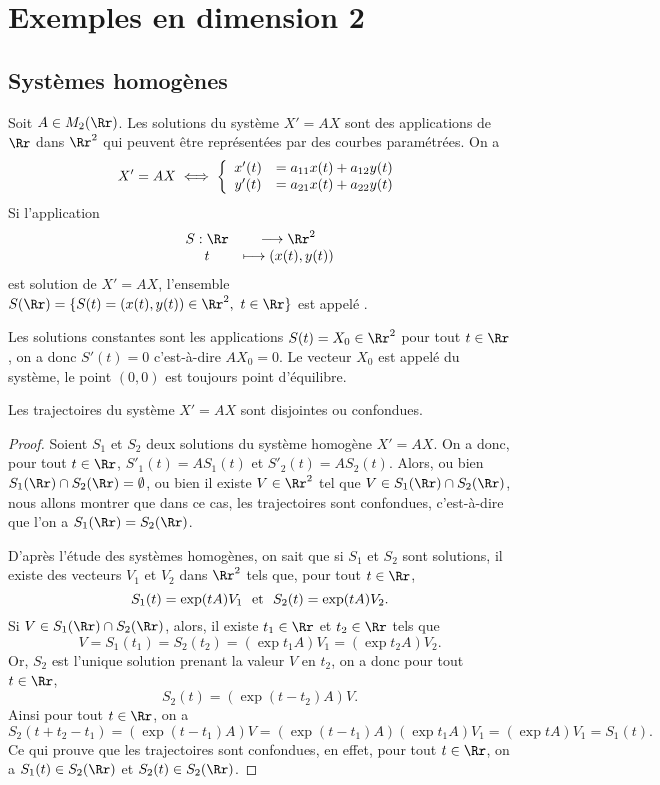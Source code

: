 \documentclass[class=report,crop=false]{standalone}
\begin{document}
\section{Exemples en dimension 2}


\subsection{Systèmes homogènes}

Soit $A\in M_2(\Rr)$. Les solutions du système $X'=AX$ sont des applications 
de $\Rr$ dans $\Rr^2$ qui peuvent être
représentées par des courbes paramétrées. On a
$$X'=AX\iff\left\{\begin{array}{cc}x'(t)&=a_{11}x(t)+a_{12}y(t)\cr
y'(t)&=a_{21}x(t)+a_{22}y(t)\end{array}
\right.$$
Si l'application 
$$\begin{array}{cc}S:\Rr&\longrightarrow\Rr^2\cr t&\longmapsto(x(t),y(t))\end{array}$$ 
est solution de $X'=AX$, l'ensemble $S(\Rr)=\{S(t)=(x(t),y(t))\in\Rr^2,\ t\in\Rr\}$ est 
appelé . 

Les solutions constantes sont les applications $S(t)=X_0\in\Rr^2$ 
pour tout $t\in \Rr$, on a donc $S'(t)=0$ c'est-à-dire $AX_0=0$. 
Le vecteur $X_0$ est appelé  du système, le 
point $(0,0)$ est toujours point d'équilibre.


\begin{proposition}
Les trajectoires du système $X'=AX$ sont disjointes ou confondues. 
\end{proposition} 

\begin{proof}
Soient $S_1$ et $S_2$ deux solutions du système homogène $X'=AX$. On a donc, pour tout $t\in\Rr$, 
$S'_1(t)=AS_1(t)$ et $S'_2(t)=AS_2(t)$. Alors, ou bien $S_1(\Rr)\cap S_2(\Rr)=\emptyset$, ou bien il existe $V\in\Rr^2$ tel que $V\in S_1(\Rr)\cap S_2(\Rr)$, nous allons montrer que dans ce cas, les trajectoires sont confondues, c'est-à-dire que l'on a $S_1(\Rr)=S_2(\Rr)$.

D'après l'étude des systèmes homogènes, on sait que si $S_1$ et $S_2$ sont solutions, il existe des vecteurs $V_1$ et $V_2$ dans $\Rr^2$ tels que, pour tout $t\in\Rr$,
$$S_1(t)=\exp(tA)V_1\ \ {\hbox{et}}\ \ S_2(t)=\exp(tA)V_2.$$
Si $V\in S_1(\Rr)\cap S_2(\Rr)$, alors, il existe $t_1\in\Rr$ et $t_2\in\Rr$ tels que 
$$V=S_1(t_1)=S_2(t_2)=(\exp t_1A)V_1=(\exp t_2A)V_2.$$
Or, $S_2$ est l'unique solution prenant la valeur $V$ en $t_2$, on a donc pour tout $t\in\Rr$,
$$S_2(t)=(\exp(t-t_2)A)V.$$
Ainsi pour tout $t\in\Rr$, on a 
$$S_2(t+t_2-t_1)=(\exp(t-t_1)A)V=(\exp(t-t_1)A)(\exp t_1A)V_1=(\exp tA)V_1=S_1(t).$$
Ce qui prouve que les trajectoires sont confondues, en effet, pour tout $t\in\Rr$, on a $S_1(t)\in S_2(\Rr)$ et 
$S_2(t)\in S_2(\Rr)$.
\end{proof}
\end{document}
